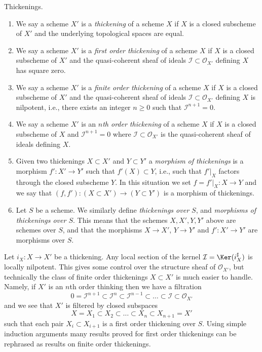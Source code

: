 \begin{definition}
\label{definition-thickening}
Thickenings.
\begin{enumerate}
\item We say a scheme $X'$ is a {\it thickening} of a scheme $X$ if
$X$ is a closed subscheme of $X'$ and the underlying topological spaces
are equal.
\item We say a scheme $X'$ is a {\it first order thickening} of a scheme $X$ if
$X$ is a closed subscheme of $X'$ and the quasi-coherent sheaf of ideals
$\mathcal{I} \subset \mathcal{O}_{X'}$ defining $X$ has square zero.
\item We say a scheme $X'$ is a {\it finite order thickening} of a scheme $X$
if $X$ is a closed subscheme of $X'$ and the quasi-coherent sheaf of ideals
$\mathcal{I} \subset \mathcal{O}_{X'}$ defining $X$ is nilpotent, i.e.,
there exists an integer $n \geq 0$ such that $\mathcal{I}^{n + 1} = 0$.
\item We say a scheme $X'$ is an {\it $n$th order thickening} of a scheme $X$
if $X$ is a closed subscheme of $X$ and $\mathcal{I}^{n + 1} = 0$
where $\mathcal{I} \subset \mathcal{O}_{X'}$ is the
quasi-coherent sheaf of ideals defining $X$.
\item Given two thickenings $X \subset X'$ and $Y \subset Y'$ a
{\it morphism of thickenings} is a morphism $f' : X' \to Y'$ such that
$f'(X) \subset Y$, i.e., such that $f'|_X$ factors through the closed
subscheme $Y$. In this situation we set $f = f'|_X : X \to Y$ and we say
that $(f, f') : (X \subset X') \to (Y \subset Y')$ is a morphism of
thickenings.
\item Let $S$ be a scheme. We similarly define {\it thickenings over $S$}, and
{\it morphisms of thickenings over $S$}. This means that the schemes
$X, X', Y, Y'$ above are schemes over $S$, and that the morphisms
$X \to X'$, $Y \to Y'$ and $f' : X' \to Y'$ are morphisms over $S$.
\end{enumerate}
\end{definition}

\noindent
Let $i_X : X \to X'$ be a thickening. Any local section of the kernel
$\mathcal{I} = \Ker(i_X^\sharp)$ is locally nilpotent. This gives
some control over the structure sheaf of $\mathcal{O}_{X'}$, but
technically the class of finite order thickenings $X \subset X'$
is much easier to handle. Namely, if $X'$ is an $n$th order thinking
then we have a filtration
$$
0 = \mathcal{I}^{n + 1} \subset
\mathcal{I}^n \subset
\mathcal{I}^{n - 1} \subset \ldots \subset
\mathcal{I} \subset \mathcal{O}_{X'}
$$
and we see that $X'$ is filtered by closed subspaces
$$
X = X_1 \subset X_2 \subset \ldots \subset X_n \subset X_{n + 1} = X'
$$
such that each pair $X_i \subset X_{i + 1}$ is a first order thickening
over $S$. Using simple induction arguments many results proved for first order
thickenings can be rephrased as results on finite order thickenings.

